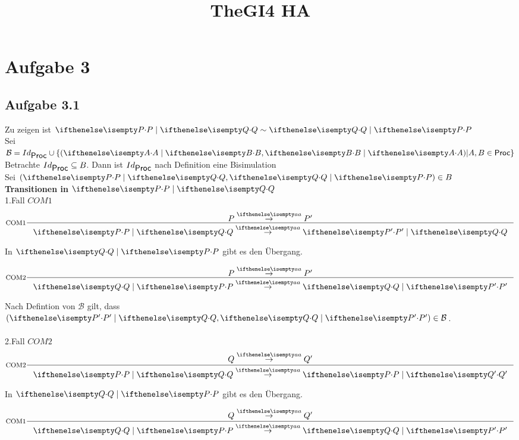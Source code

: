 \documentclass[a4paper,10pt]{article}
\title{TheGI4 HA}
\author{}
\begin{document}
\maketitle


\section{Aufgabe 3}

\subsection{Aufgabe 3.1}

Zu zeigen ist $\Par{P}{Q} \bisim \Par{Q}{P}$ \\
Sei $\mathcal{B} = Id_{\Proc} \cup \{ (\Par{A}{B},\Par{B}{A}) | A,B \in \Proc \}$ \\

Betrachte $Id_{\mbox{\sf Proc}} \subseteq B$. Dann ist $Id_{\mbox{\sf Proc}}$ nach Definition eine Bisimulation\\

Sei $(\Par {P}{Q},\Par {Q}{P}) \in B$ \\

\textbf{Transitionen in $\Par {P}{Q}$}\\

1.Fall $COM1$ \\
\begin{displaymath}
    \inference[COM1]
    {
      P \CCSTrans{a} P'
    }
    {
        \Par{P}{Q} \CCSTrans{a} \Par{P'}{Q}
    }
\end{displaymath}

In $\Par {Q}{P}$ gibt es den Übergang.

\begin{displaymath}
    \inference[COM2]
    {
      P \CCSTrans{a} P'
    }
    {
        \Par{Q}{P} \CCSTrans{a} \Par{Q}{P'}
    }
\end{displaymath}

Nach Defintion von $\mathcal{B}$ gilt, dass $(\Par{P'}{Q},\Par{Q}{P'}) \in \mathcal{B}$.\\
\\
2.Fall $COM2$ \\
\begin{displaymath}
    \inference[COM2]
    {
      Q \CCSTrans{a} Q'
    }
    {
        \Par{P}{Q} \CCSTrans{a} \Par{P}{Q'}
    }
\end{displaymath}

In $\Par {Q}{P}$ gibt es den Übergang.

\begin{displaymath}
    \inference[COM1]
    {
      Q \CCSTrans{a} Q'
    }
    {
        \Par{Q}{P} \CCSTrans{a} \Par{Q}{P'}
    }
\end{displaymath}
\end{document}
